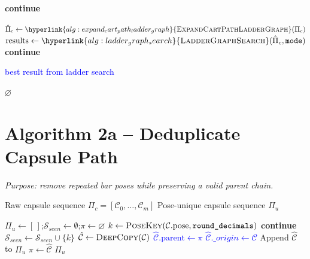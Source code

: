 \documentclass[11pt]{article}
\newcommand{\Continue}{\State \textbf{continue}}
\newcommand{\chg}[1]{\textcolor{blue}{#1}}
\newcommand{\AlgTarget}[1]{\hypertarget{#1}{}}
\newcommand{\AlgLink}[2]{\hyperlink{#1}{#2}}
\begin{document}
\begin{algorithm}[H]
\begin{algorithmic}[1]
    \If{\chg{all rungs in $\Pi_c$ already expanded}} \Continue \EndIf

    \State \chg{$\hat{\Pi}_c \gets \AlgLink{alg:expand_cart_path_ladder_graph}{\textsc{ExpandCartPathLadderGraph}}(\Pi_c)$}
    \State \chg{$\text{results} \gets \AlgLink{alg:ladder_graph_search}{\textsc{LadderGraphSearch}}(\hat{\Pi}_c,\texttt{mode})$}
     \Continue \EndIf

    \State \Return \chg{best result from ladder search}

  \EndIf
\EndFor
\State \Return $\varnothing$
\end{algorithmic}
\end{algorithm}

\section*{Algorithm 2a -- Deduplicate Capsule Path}
\noindent\textit{Purpose: remove repeated bar poses while preserving a valid parent chain.}
\AlgTarget{alg:deduplicate}
\begin{algorithm}[H]
\caption{\textsc{Deduplicate}($\Pi_c$)}
\begin{algorithmic}[1]
\Require Raw capsule sequence $\Pi_c=[\mathcal{C}_0,\ldots,\mathcal{C}_m]$
\Ensure  Pose-unique capsule sequence $\Pi_u$

\State $\Pi_u \gets [\,]$;\quad $\mathcal{S}_{seen} \gets \emptyset$;\quad $\pi \gets \varnothing$
  \State \chg{$k \gets \textsc{PoseKey}(\mathcal{C}.\text{pose},\texttt{round\_decimals})$}
    \Continue
  \EndIf
  \State $\mathcal{S}_{seen} \gets \mathcal{S}_{seen} \cup \{k\}$
  \State \chg{$\hat{\mathcal{C}} \gets \textsc{DeepCopy}(\mathcal{C})$}
  \State \chg{$\hat{\mathcal{C}}.\text{parent} \gets \pi$}
  \State \chg{$\hat{\mathcal{C}}.\_origin \gets \mathcal{C}$}
  \State Append $\hat{\mathcal{C}}$ to $\Pi_u$
  \State $\pi \gets \hat{\mathcal{C}}$
\EndFor
\State \Return $\Pi_u$
\end{algorithmic}
\end{algorithm}

\end{document}
